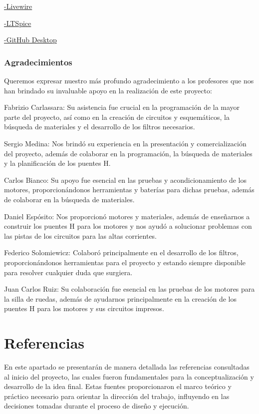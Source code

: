 \documentclass{article}
\begin{document}
    \href{https://livewire.laravel.com/}{-Livewire}
    \newline

    \href{https://www.analog.com/en/resources/design-tools-and-calculators/ltspice-simulator.html}{-LTSpice}
    \newline

    \href{https://github.com/apps/desktop}{-GitHub Desktop}

\subsubsection{Agradecimientos}

Queremos expresar nuestro más profundo agradecimiento a los profesores que nos han brindado su invaluable apoyo en la realización de este proyecto:


Fabrizio Carlassara: Su asistencia fue crucial en la programación de la mayor parte del proyecto, así como en la creación de circuitos y esquemáticos, la búsqueda de materiales y el desarrollo de los filtros necesarios.


Sergio Medina: Nos brindó su experiencia en la presentación y comercialización del proyecto, además de colaborar en la programación, la búsqueda de materiales y la planificación de los puentes H.


Carlos Bianco: Su apoyo fue esencial en las pruebas y acondicionamiento de los motores, proporcionándonos herramientas y baterías para dichas pruebas, además de colaborar en la búsqueda de materiales.


Daniel Espósito: Nos proporcionó motores y materiales, además de enseñarnos a construir los puentes H para los motores y nos ayudó a solucionar problemas con las pistas de los circuitos para las altas corrientes.


Federico Solomiewicz: Colaboró principalmente en el desarrollo de los filtros, proporcionándonos herramientas para el proyecto y estando siempre disponible para resolver cualquier duda que surgiera.


Juan Carlos Ruiz: Su colaboración fue esencial en las pruebas de los motores para la silla de ruedas, además de ayudarnos principalmente en la creación de los puentes H para los motores y sus circuitos impresos.



\section{Referencias}
En este apartado se presentarán de manera detallada las referencias consultadas al inicio del proyecto, las cuales fueron fundamentales para la conceptualización y desarrollo de la idea final. Estas fuentes proporcionaron el marco teórico y práctico necesario para orientar la dirección del trabajo, influyendo en las decisiones tomadas durante el proceso de diseño y ejecución.
\end{document}
